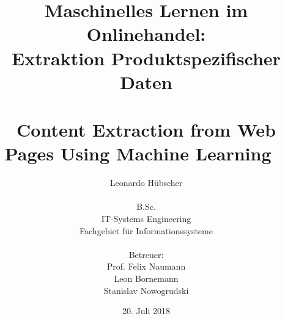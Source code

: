 \titlehead{
\vspace*{2cm}
\centering \texttt{[image: resources/hpi-logo.pdf]}
}
\subject{Bachelorarbeit}
\title{
Maschinelles Lernen im Onlinehandel: \\
Extraktion Produktspezifischer Daten \\
\bigskip ~\\
\large{Content Extraction from Web Pages Using Machine Learning}
\medskip ~\\
}
\author{
Leonardo Hübscher\\
\\B.Sc.\\
IT-Systems Engineering\\
Fachgebiet für Informationssysteme \\
\bigskip ~\\
Betreuer:\\
Prof. Felix Naumann\\
Leon Bornemann\\
Stanislav Nowogrudski
}
\date{20. Juli 2018}